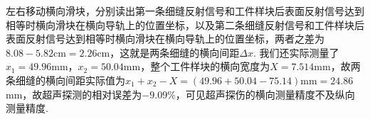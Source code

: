 \documentclass[UTF8,10pt,a4paper]{article}
\begin{document}
左右移动横向滑块，分别读出第一条细缝反射信号和工件样块后表面反射信号达到相等时横向滑块在横向导轨上的位置坐标，以及第二条细缝反射信号和工件样块后表面反射信号达到相等时横向滑块在横向导轨上的位置坐标，两者之差为$8.08-5.82\text{cm}=2.26$cm，这就是两条细缝的横向间距$\Delta x$. 我们还实际测量了$x_1=49.96$mm，$x_2=50.04$mm，整个工件样块的横向宽度为$X=7.514$mm，故两条细缝的横向间距实际值为$x_1+x_2-X=(49.96+50.04-75.14)\text{mm}=24.86$mm，故超声探测的相对误差为$-9.09\%$，可见超声探伤的横向测量精度不及纵向测量精度.
\end{document}
